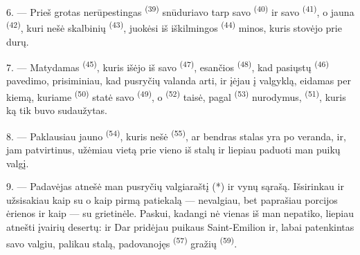 \VUsaut{4.0mm}
\VUsaut{3.0mm}

6. --- Prieš grotas nerūpestingas  \textsuperscript{(39)}
snūduriavo tarp savo  \textsuperscript{(40)} ir savo  \textsuperscript{(41)}, o jauna  \textsuperscript{(42)},
kuri nešė skalbinių  \textsuperscript{(43)}, juokėsi iš iškilmingos
 \textsuperscript{(44)} minos, kuris stovėjo prie durų.

7. --- Matydamas  \textsuperscript{(45)}, kuris išėjo iš savo
 \textsuperscript{(47)}, esančios 
\textsuperscript{(48)}, kad pasiųstų  \textsuperscript{(46)}
pavedimo, prisiminiau, kad pusryčių valanda arti, ir įėjau į valgyklą, eidamas per
kiemą, kuriame  \textsuperscript{(50)} statė savo
 \textsuperscript{(49)}, o 
\textsuperscript{(52)} taisė, pagal  \textsuperscript{(53)}
nurodymus,  \textsuperscript{(51)}, kuris ką tik buvo
sudaužytas.

8. --- Paklausiau jauno  \textsuperscript{(54)}, kuris nešė
 \textsuperscript{(55)}, ar bendras stalas yra po veranda, ir,
jam patvirtinus, užėmiau vietą prie vieno iš stalų ir liepiau paduoti man puikų
valgį.


\VUsaut{4.0mm}
\VUsaut{3.0mm}

9. --- Padavėjas atnešė man pusryčių valgiaraštį (*) ir vynų sąrašą. Išsirinkau ir
užsisakiau kaip  su  o kaip pirmą
patiekalą ---   nevalgiau,
bet paprašiau porcijos ėrienos  ir kaip 
---  su grietinėle. Paskui, kadangi nė vienas iš 
man nepatiko, liepiau atnešti įvairių desertų:   ir
 Dar pridėjau puikaus Saint-Emilion  ir, labai
patenkintas savo valgiu, palikau stalą, padovanojęs 
\textsuperscript{(57)} gražių  \textsuperscript{(59)}.


